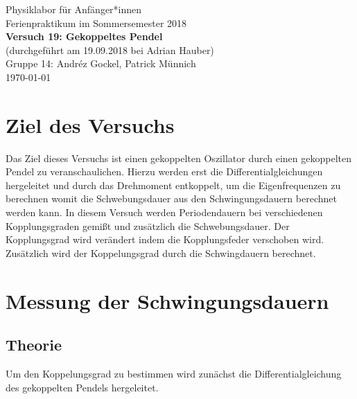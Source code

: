 \documentclass[11pt,a4paper]{article}
\begin{document}
{
\centering 
\large 
Physiklabor für Anf\"anger*innen \\
Ferienpraktikum im Sommersemester 2018 \\[4mm]
\textbf{\LARGE 
Versuch 19: Gekoppeltes Pendel 
} \\[3mm]
(durchgef\"uhrt am 19.09.2018 bei Adrian Hauber) \\
Gruppe 14: Andréz Gockel, Patrick M\"unnich\\
\today \\[10mm]
}

\vspace{50pt}
\tableofcontents
\vspace{22pt}
\listoftables
\vspace{22pt}
\listoffigures
\pagebreak

\section{Ziel des Versuchs}
Das Ziel dieses Versuchs ist einen gekoppelten Oszillator durch einen gekoppelten Pendel zu veranschaulichen. Hierzu werden erst die Differentialgleichungen hergeleitet und durch das Drehmoment entkoppelt, um die Eigenfrequenzen zu berechnen womit die Schwebungsdauer aus den Schwingungsdauern berechnet werden kann. In diesem Versuch werden Periodendauern bei verschiedenen Kopplungsgraden gemißt und zusätzlich die Schwebungsdauer. Der Kopplungsgrad wird verändert indem die Kopplungsfeder verschoben wird. Zusätzlich wird der Koppelungsgrad durch die Schwingdauern berechnet.

\section{Messung der Schwingungsdauern}

\subsection{Theorie}

Um den Koppelungsgrad zu bestimmen wird zunächst die Differentialgleichung des gekoppelten Pendels hergeleitet.
\end{document}
